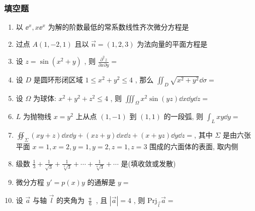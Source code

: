 \subsubsection{填空题}
\begin{enumerate}
	\item 以 $\ee^x,x\ee^x$ 为解的阶数最低的常系数线性齐次微分方程是\underline{\hspace{8pc}}
	
	\item 过点 $A(1,-2,1)$ 且以 $\vec{n}=(1,2,3)$ 为法向量的平面方程是\underline{\hspace{8pc}}
	
	\item 设 $z=\sin \left(x^{2}+y\right)$ , 则 $\frac{\partial^{2} z}{\partial x \partial y}=$\underline{\hspace{8pc}}
	
	\item 设 $D$ 是圆环形闭区域 $1 \leq x^{2}+y^{2} \leq 4$ , 那么 $\iint_{D} \sqrt{x^{2}+y^{2}} \dd \sigma=$\underline{\hspace{8pc}}
	
	\item 设 $\Omega$ 为球体: $x^{2}+y^{2}+z^{2} \leq 4$ , 则 $\iiint_{\Omega} x^{2} \sin (y z) \dd x \dd y \dd z=$\underline{\hspace{8pc}}
	
	\item $L$ 为抛物线 $x=y^2$ 上从点 $(1,-1)$ 到 $(1,1)$ 的一段弧, 则 $\int_{L} x y \dd y=$\underline{\hspace{8pc}}
	
	\item $\oiint_{\Sigma}(x y+z) \dd x \dd y+(x z+y) \dd x \dd z+(x+y z) \dd y \dd z=$\underline{\hspace{8pc}}, 其中 $\Sigma$ 是由六张平面 $x=1,x=2,y=1,y=2,z=1,z=3$ 围成的六面体的表面, 取内侧
	
	\item 级数 $\frac{1}{3}+\frac{1}{\sqrt{3}}+\frac{1}{\sqrt[3]{3}}+\cdots+\frac{1}{\sqrt[n]{3}}+\cdots$ 是\underline{\hspace{8pc}}(填收敛或发散)
	
	\item 微分方程 $y'=p(x) y$ 的通解是 $y=$\underline{\hspace{8pc}}
	
	\item 设 $\vec{a}$ 与轴 $\vec{l}$ 的夹角为 $\frac{\uppi}{6}$ , 且 $|\vec{a}|=4$ , 则 $\mathrm{Prj}_{\vec{l}} \vec{a}=$\underline{\hspace{8pc}}
	

\end{enumerate}
